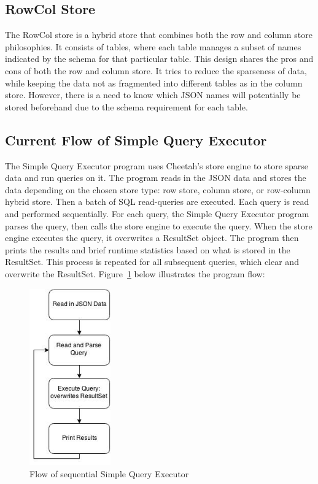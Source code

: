 \documentclass[11pt,journal,compsoc]{IEEEtran}
\begin{document}
\subsection{RowCol Store}

The RowCol store is a hybrid store that combines both the row and column store
philosophies. It consists of tables, where each table manages a subset of names
indicated by the schema for that particular table. This design shares the pros
and cons of both the row and column store. It tries to reduce the sparseness of
data, while keeping the data not as fragmented into different tables as in the
column store. However, there is a need to know which JSON names will potentially
be stored beforehand due to the schema requirement for each table.


\subsection{Current Flow of Simple Query Executor}

The Simple Query Executor program uses Cheetah’s store engine to store sparse
data and run queries on it. The program reads in the JSON data and stores the
data depending on the chosen store type: row store, column store, or row-column
hybrid store. Then a batch of SQL read-queries are executed. Each query is read
and performed sequentially. For each query, the Simple Query Executor program
parses the query, then calls the store engine to execute the query. When the
store engine executes the query, it overwrites a ResultSet object. The program
then prints the results and brief runtime statistics based on what is stored in
the ResultSet. This process is repeated for all subsequent queries, which clear
and overwrite the ResultSet. Figure~\ref{fig_sequential_query} below illustrates the program flow:

\begin{figure}
\includegraphics[height=3in]{images/query_sequential}
\caption{Flow of sequential Simple Query Executor}
\label{fig_sequential_query}
\end{figure}
\end{document}
